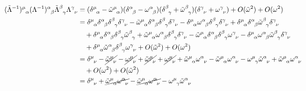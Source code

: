     \begin{equation*}
    \begin{aligned}
        (\tilde \Lambda^{-1})^{\mu}_{\phantom \mu \alpha} (\Lambda^{-1})^{\alpha}_{\phantom \alpha \beta} \tilde \Lambda^{\beta}_{\phantom \beta \gamma} \Lambda^{\gamma}_{\phantom \gamma \nu} & = (\delta^{\mu}_{\phantom \mu \alpha} - \tilde \omega^{\mu}_{\phantom \mu \alpha})(\delta^{\alpha}_{\phantom \alpha \beta} - \omega^{\alpha}_{\phantom \alpha \beta})(\delta^{\beta}_{\phantom \beta \gamma} + \tilde \omega^{\beta}_{\phantom \beta \gamma})(\delta^{\gamma}_{\phantom \gamma \nu} + \omega^{\gamma}_{\phantom \gamma \nu}) + O(\tilde \omega^2) + O(\omega^2) \\ & = \delta^{\mu}_{\phantom \mu \alpha} \delta^{\alpha}_{\phantom \alpha \beta} \delta^{\beta}_{\phantom \beta \gamma} \delta^{\gamma}_{\phantom \gamma \nu} - \tilde \omega^{\mu}_{\phantom \mu \alpha} \delta^{\alpha}_{\phantom \alpha \beta} \delta^{\beta}_{\phantom \beta \gamma} \delta^{\gamma}_{\phantom \gamma \nu} - \delta^{\mu}_{\phantom \mu \alpha} \omega^{\alpha}_{\phantom \alpha \beta}\delta^{\beta}_{\phantom \beta \gamma}\delta^{\gamma}_{\phantom \gamma \nu} + \delta^{\mu}_{\phantom \mu \alpha} \delta^{\alpha}_{\phantom \alpha \beta} \tilde \omega^{\beta}_{\phantom \beta \gamma}\delta^{\gamma}_{\phantom \gamma \nu} \\ & \quad + \delta^{\mu}_{\phantom \mu \alpha} \delta^{\alpha}_{\phantom \alpha \beta} \delta^{\beta}_{\phantom \beta \gamma} \tilde \omega^{\beta}_{\phantom \beta \gamma} + \tilde \omega^{\mu}_{\phantom \mu \alpha} \omega^{\alpha}_{\phantom \alpha \beta} \delta^{\beta}_{\phantom \beta \gamma} \delta^{\gamma}_{\phantom \gamma \nu} - \tilde \omega^{\mu}_{\phantom \mu \alpha} \delta^{\alpha}_{\phantom \alpha \beta} \delta^{\beta}_{\phantom \beta \gamma} \omega^{\gamma}_{\phantom \gamma \nu} - \delta^{\mu}_{\phantom \mu \alpha} \omega^{\alpha}_{\phantom \alpha \beta} \tilde \omega^{\beta}_{\phantom \beta \gamma} \delta^{\gamma}_{\phantom \gamma \nu} \\ & \quad + \delta^{\mu}_{\phantom \mu \alpha} \tilde \omega^{\alpha}_{\phantom \alpha \beta} \delta^{\beta}_{\phantom \beta \gamma} \omega^{\gamma}_{\phantom \gamma \nu} + O(\tilde \omega^2) + O(\omega^2) \\ & = \delta^{\mu}_{\phantom \mu \nu} - \cancel{\tilde \omega^{\mu}_{\phantom \mu \nu}} - \cancel{\omega^{\mu}_{\phantom \mu \nu}} + \cancel{\tilde \omega^{\mu}_{\phantom \mu \nu}} + \cancel{\omega^{\mu}_{\phantom \mu \nu}} + \tilde \omega^{\mu}_{\phantom \mu \alpha} \omega^{\alpha}_{\phantom \alpha \nu} - \tilde \omega^{\mu}_{\phantom \mu \alpha} \omega^{\alpha}_{\phantom \alpha \nu} - \omega^{\mu}_{\phantom \mu \gamma} \tilde \omega^{\alpha}_{\phantom \alpha \nu} + \tilde \omega^{\mu}_{\phantom \mu \alpha} \omega^{\alpha}_{\phantom \alpha \nu} \\ & \quad + O(\omega^2) + O(\tilde \omega^2) \\ & = \delta^{\mu}_{\phantom \mu \nu} + \cancel{\tilde \omega^{\mu}_{\phantom \mu \alpha} \omega^{\alpha}_{\phantom \alpha \nu}} - \cancel{\tilde \omega^{\mu}_{\phantom \mu \alpha} \omega^{\alpha}_{\phantom \alpha \nu}} - \omega^{\mu}_{\phantom \mu \gamma} \tilde \omega^{\alpha}_{\phantom \alpha \nu} 
\end{aligned}
\end{equation*}
